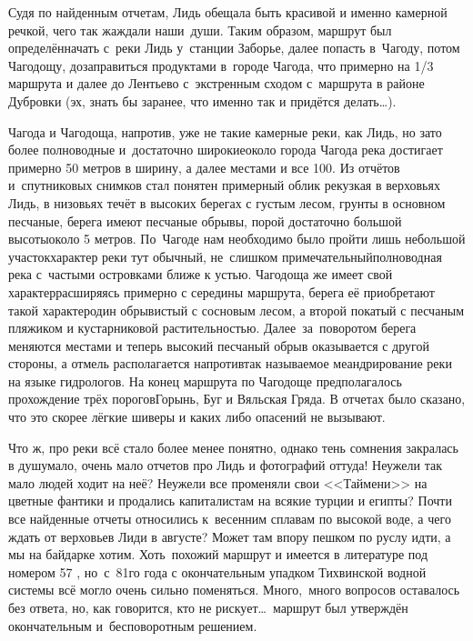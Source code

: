 Судя по найденным отчетам, Лидь обещала быть красивой и именно камерной речкой, чего так жаждали наши~души. Таким образом, маршрут был определён\mdash начать с~реки Лидь у~станции Заборье, далее попасть в~Чагоду, потом Чагодощу, дозаправиться продуктами в~городе Чагода, что примерно на 1/3 маршрута и далее до Лентьево с~экстренным сходом с~маршрута в районе Дубровки (эх, знать бы заранее, что именно так и придётся делать\ldots).
 
Чагода и Чагодоща, напротив, уже не такие камерные реки, как Лидь, но зато более полноводные и~достаточно широкие\mdash около города Чагода река достигает примерно 50 метров в ширину, а далее местами и все 100. Из отчётов и~спутниковых снимков стал понятен примерный облик рек\mdash узкая в верховьях Лидь, в низовьях течёт в высоких берегах с густым лесом, грунты в основном песчаные, берега имеют песчаные обрывы, порой достаточно большой высоты\mdash около 5 метров. По~Чагоде нам необходимо было пройти лишь небольшой участок\mdash характер реки тут обычный, не~слишком примечательный\mdash полноводная река с~частыми островками ближе к устью. Чагодоща же имеет свой характер\mdash расширяясь примерно с середины маршрута, берега её приобретают такой характер\mdash один обрывистый с сосновым лесом, а второй покатый с песчаным пляжиком и кустарниковой растительностью. Далее~за~поворотом берега меняются местами и теперь высокий песчаный обрыв оказывается с другой стороны, а отмель располагается напротив\mdash так называемое меандрирование реки на языке гидрологов. На конец маршрута по Чагодоще предполагалось прохождение трёх порогов\mdash Горынь, Буг и Вяльская Гряда. В отчетах было сказано, что это скорее лёгкие шиверы и каких либо опасений не вызывают. 

Что ж, про реки всё стало более менее понятно, однако тень сомнения закралась в душу\mdash мало, очень мало отчетов про Лидь и фотографий оттуда! Неужели так мало людей ходит на неё? Неужели все променяли свои <<Таймени>> на цветные фантики и продались капиталистам на всякие турции и египты? Почти все найденные отчеты относились к~весенним сплавам по высокой воде, а чего ждать от верховьев Лиди в августе? Может там впору пешком по руслу идти, а мы на байдарке хотим. Хоть~похожий маршрут и имеется в литературе под номером 57 \cite{Рыжавский}, но~с~81\sdash го года с окончательным упадком Тихвинской водной системы всё могло очень сильно поменяться. Много,~много вопросов оставалось без ответа, но, как говорится, кто не рискует\ldots~маршрут был утверждён окончательным и~бесповоротным решением.

